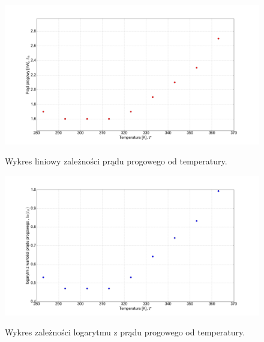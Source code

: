 \documentclass[a4paper, portrait,12pt]{report}
\begin{document}
\begin{figure}
\center
  \includegraphics[scale=0.30]{plot_vcsel850/plot_lin_i_th.png}
  \label{rys1}
  \caption{Wykres liniowy zależności prądu progowego od temperatury.} 
\end{figure}

\begin{figure}
\center
  \includegraphics[scale=0.30]{plot_vcsel850/plot_log_i_th.png}
  \label{rys1}
  \caption{Wykres zależności logarytmu z prądu progowego od temperatury.} 
\end{figure}
\end{document}
